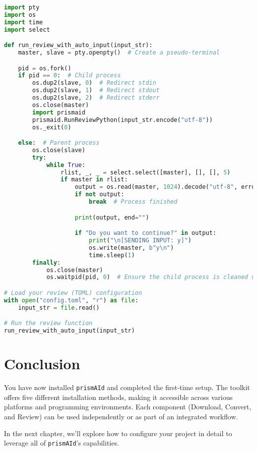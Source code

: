\begin{commandbox}
\begin{lstlisting}[language=Python]
import pty
import os
import time
import select

def run_review_with_auto_input(input_str):
    master, slave = pty.openpty()  # Create a pseudo-terminal

    pid = os.fork()
    if pid == 0:  # Child process
        os.dup2(slave, 0)  # Redirect stdin
        os.dup2(slave, 1)  # Redirect stdout
        os.dup2(slave, 2)  # Redirect stderr
        os.close(master)
        import prismaid
        prismaid.RunReviewPython(input_str.encode("utf-8"))
        os._exit(0)

    else:  # Parent process
        os.close(slave)
        try:
            while True:
                rlist, _, _ = select.select([master], [], [], 5)
                if master in rlist:
                    output = os.read(master, 1024).decode("utf-8", errors="ignore")
                    if not output:
                        break  # Process finished

                    print(output, end="")

                    if "Do you want to continue?" in output:
                        print("\n[SENDING INPUT: y]")
                        os.write(master, b"y\n")
                        time.sleep(1)
        finally:
            os.close(master)
            os.waitpid(pid, 0)  # Ensure the child process is cleaned up

# Load your review (TOML) configuration
with open("config.toml", "r") as file:
    input_str = file.read()

# Run the review function
run_review_with_auto_input(input_str)
\end{lstlisting}
\end{commandbox}

\section{Conclusion}

You have now installed \texttt{prismAId} and completed the first-time setup. The toolkit offers five different installation methods, making it accessible across various platforms and programming environments. Each component (Download, Convert, and Review) can be used independently or as part of an integrated workflow.

In the next chapter, we'll explore how to configure your project in detail to leverage all of \texttt{prismAId}'s capabilities.
